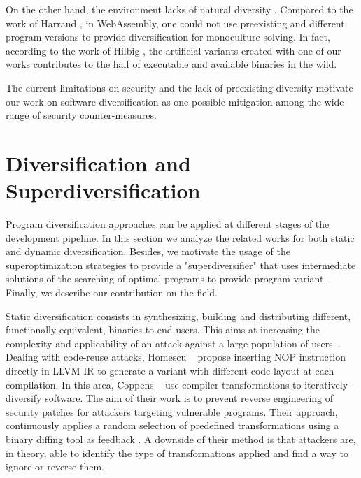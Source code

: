 On the other hand, the \wasm environment lacks of natural diversity \cite{natural_diversity}. Compared to the work of Harrand \etal \citationneeded, in WebAssembly, one could not use preexisting and different program versions to provide diversification for monoculture solving. In fact, according to the work of Hilbig \etal \cite{Hilbig2021AnES}, the artificial variants created with one of our works contributes to the half of executable and available \wasm binaries in the wild. 


The current limitations on security and the lack of preexisting diversity motivate our work on software diversification as one possible mitigation among the wide range of security counter-measures. 

\section{Diversification and Superdiversification}
\label{sota:diversification}

Program diversification approaches can be applied at different stages of the development pipeline. In this section we analyze the related works for both static and dynamic diversification. Besides, we motivate the usage of the superoptimization strategies to provide a "superdiversifier" that uses intermediate solutions of the searching of optimal programs to provide program variant. Finally, we describe our contribution on the field.


Static diversification consists in synthesizing, building and distributing different, functionally equivalent, binaries to end users. This aims at increasing the complexity and applicability of an attack against a large population of users~\cite{cohen1993operating}. 
Dealing with code-reuse attacks, Homescu \etal~\cite{homescu2013profile} propose inserting NOP instruction directly in LLVM IR to generate a variant with different code layout at each compilation. 
In this area, Coppens \etal~\cite{coppens2013feedback} use compiler transformations to iteratively diversify software.
The aim of their work is to prevent reverse engineering of security patches for attackers targeting vulnerable programs.
Their approach, continuously applies a random selection of predefined transformations using a binary diffing tool as feedback \citationneeded.
A downside of their method is that attackers are, in theory, able to identify the type of transformations applied and find a way to ignore or reverse them.

